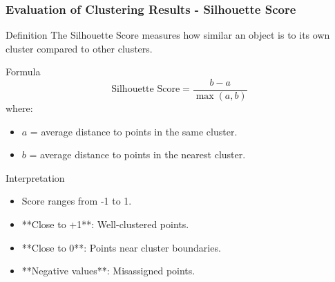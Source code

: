 \documentclass[aspectratio=169]{beamer}
\begin{document}
\begin{frame}[fragile]
    \frametitle{Evaluation of Clustering Results - Silhouette Score}
    \begin{block}{Definition}
        The Silhouette Score measures how similar an object is to its own cluster compared to other clusters.
    \end{block}
    \begin{block}{Formula}
        \begin{equation}
        \text{Silhouette Score} = \frac{b - a}{\max(a, b)}
        \end{equation}
        where:
        \begin{itemize}
            \item \( a \) = average distance to points in the same cluster.
            \item \( b \) = average distance to points in the nearest cluster.
        \end{itemize}
    \end{block}
    \begin{block}{Interpretation}
        \begin{itemize}
            \item Score ranges from -1 to 1.
            \item **Close to +1**: Well-clustered points.
            \item **Close to 0**: Points near cluster boundaries.
            \item **Negative values**: Misassigned points.
        \end{itemize}
    \end{block}
\end{frame}
\end{document}
